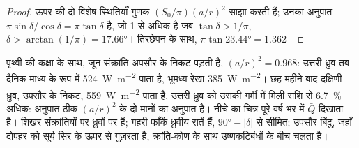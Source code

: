 \begin{proof}
ऊपर की दो विशेष स्थितियाँ गुणक $(S_0/\pi)(a/r)^2$ साझा करती हैं; उनका अनुपात $\pi\sin\delta/\cos\delta = \pi\tan\delta$ है, जो 1 से अधिक है जब $\tan\delta >
1/\pi$, $\delta > \arctan(1/\pi) = \ang{17.66}$। तिरछेपन के साथ, $\pi\tan\ang{23.44} = 1.362$।
\end{proof}

पृथ्वी की कक्षा के साथ, जून संक्रांति अपसौर के निकट पड़ती है, $(a/r)^2 = 0.968$: उत्तरी ध्रुव तब दैनिक माध्य के रूप में \qty{524}{W.m^{-2}} पाता है, भूमध्य रेखा \qty{385}{W.m^{-2}}। छह महीने बाद दक्षिणी ध्रुव, उपसौर के निकट, \qty{559}{W.m^{-2}} पाता है, उत्तरी ध्रुव को उसकी गर्मी में मिली राशि से \qty{6.7}{\percent} अधिक: अनुपात ठीक $(a/r)^2$ के दो मानों का अनुपात है। नीचे का चित्र पूरे वर्ष भर में $\bar Q$ दिखाता है। शिखर संक्रांतियों पर ध्रुवों पर हैं; गहरी फाँकें ध्रुवीय रातें हैं,  $\ang{90} -
|\delta|$ से सीमित; उपसौर बिंदु, जहाँ दोपहर को सूर्य सिर के ऊपर से गुज़रता है, क्रांति-कोण के साथ उष्णकटिबंधों के बीच चलता है।

